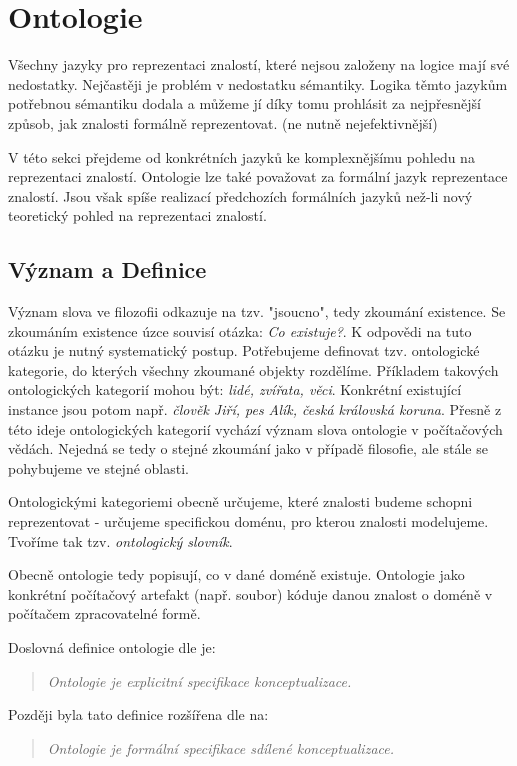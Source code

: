 \section{Ontologie} \label{ontologies}
Všechny jazyky pro reprezentaci znalostí, které nejsou založeny na logice mají své nedostatky. Nejčastěji je problém v nedostatku sémantiky. Logika těmto jazykům potřebnou sémantiku dodala a můžeme jí díky tomu prohlásit za nejpřesnější způsob, jak znalosti formálně reprezentovat. (ne nutně nejefektivnější)\par
V této sekci přejdeme od konkrétních jazyků ke komplexnějšímu pohledu na reprezentaci znalostí. Ontologie lze také považovat za formální jazyk reprezentace znalostí. Jsou  však spíše realizací předchozích formálních jazyků než-li nový teoretický pohled na reprezentaci znalostí.\par
\subsection{Význam a Definice}
Význam slova ve filozofii odkazuje na tzv. "jsoucno", tedy zkoumání existence. Se zkoumáním existence úzce souvisí otázka: \textit{Co existuje?}. K odpovědi na tuto otázku je nutný systematický postup. Potřebujeme definovat tzv. ontologické kategorie, do kterých všechny zkoumané objekty rozdělíme. Příkladem takových ontologických kategorií mohou být: \textit{lidé, zvířata, věci}. Konkrétní existující instance 
jsou potom např. \textit{člověk Jiří, pes Alík, česká královská koruna}. Přesně z této ideje ontologických kategorií vychází význam slova ontologie v počítačových vědách. \cite{Stephan2007} Nejedná se tedy o stejné zkoumání jako v případě filosofie, ale stále se pohybujeme ve stejné oblasti.\par
Ontologickými kategoriemi obecně určujeme, které znalosti budeme schopni reprezentovat - určujeme specifickou doménu, pro kterou znalosti modelujeme. Tvoříme tak tzv. \textit{ontologický slovník}.\par
Obecně ontologie tedy popisují, co v dané doméně existuje. Ontologie jako konkrétní počítačový artefakt (např. soubor) kóduje danou znalost o doméně v počítačem zpracovatelné formě.\cite{Stephan2007}\par
\noindent Doslovná definice ontologie dle \cite{gruber1993translation} je:\par
\begin{quote}
    \textit{Ontologie je explicitní specifikace konceptualizace.}
\end{quote}\par
\noindent Později byla tato definice rozšířena dle \cite{Borst97} na:\par
\begin{quote}
    \textit{Ontologie je formální specifikace sdílené konceptualizace.}
\end{quote}\par
